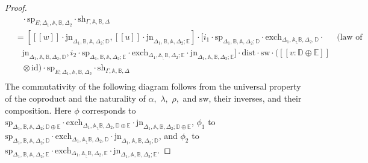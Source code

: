 \documentclass[10pt,a4paper]{amsart}
\theoremstyle{definition}
\theoremstyle{definition}
\theoremstyle{definition}
\theoremstyle{definition}
\theoremstyle{definition}
\theoremstyle{definition}
\begin{document}
\begin{proof}
\begin{align*}
  & \hspace{10pt} \cdot\text{sp}_{E; \Delta_{1},\mathbb{A},\mathbb{B},  \Delta_{2}} \cdot \text{sh}_{\Gamma,\mathbb{A}, \mathbb{B},\Delta} \\
  & = [[\![ w ]\!] \cdot \text{jn}_{\Delta_{1} ,\mathbb{B},\mathbb{A},  \Delta_{2};\mathbb{D}},  [\![u ]\!] \cdot \text{jn}_{\Delta_{1} ,\mathbb{B},\mathbb{A},  \Delta_{2};\mathbb{E}}] \cdot [ i_1 \cdot  \text{sp}_{\Delta_{1}, \mathbb{B}, \mathbb{A}, \Delta_{2};\mathbb{D}} \cdot  \text{exch}_{\Delta_{1},\underline{\mathbb{A},\mathbb{B}},  \Delta_{2},\mathbb{D}} \cdot  & {\text{(law of coproducts)}} \\
  & \hspace{10pt}  \text{jn}_{\Delta_{1},\mathbb{A},\mathbb{B},  \Delta_{2},\mathbb{D}},  i_2 \cdot  \text{sp}_{\Delta_{1}, \mathbb{B}, \mathbb{A}, \Delta_{2};\mathbb{E}} \cdot  \text{exch}_{\Delta_{1},\underline{\mathbb{A},\mathbb{B}},  \Delta_{2};\mathbb{E}} \cdot  \text{jn}_{\Delta_{1},\mathbb{A},\mathbb{B},  \Delta_{2};\mathbb{E}} ] \cdot \text{dist} \cdot \text{sw} \cdot ([\![  v : \mathbb{D} \oplus \mathbb{E}  ]\!] \\
  & \hspace{10pt} \otimes \text{id})  \cdot\text{sp}_{E; \Delta_{1},\mathbb{A},\mathbb{B},  \Delta_{2}} \cdot \text{sh}_{\Gamma,\mathbb{A}, \mathbb{B},\Delta} \\ 
\end{align*}
The commutativity of the following diagram follows from the universal property of the coproduct and the naturality of $\alpha,$ $\lambda,$ $\rho,$ and $\text{sw}$, their inverses, and their composition. Here $\phi$ corresponds to $\text{sp}_{\Delta_{1}, \mathbb{B}, \mathbb{A}, \Delta_{2}; \mathbb{D} \oplus\mathbb{E}} \cdot  \text{exch}_{\Delta_{1},\underline{\mathbb{A},\mathbb{B}},  \Delta_{2}, \mathbb{D} \oplus\mathbb{E}} \cdot  \text{jn}_{\Delta_{1},\mathbb{A},\mathbb{B},  \Delta_{2}; \mathbb{D} \oplus\mathbb{E}}$, $\phi_1$ to $\text{sp}_{\Delta_{1}, \mathbb{B}, \mathbb{A}, \Delta_{2}; \mathbb{D}} \cdot  \text{exch}_{\Delta_{1},\underline{\mathbb{A},\mathbb{B}},  \Delta_{2}, \mathbb{D}} \cdot  \text{jn}_{\Delta_{1},\mathbb{A},\mathbb{B},  \Delta_{2}; \mathbb{D}}$, and $\phi_2$ to $\text{sp}_{\Delta_{1}, \mathbb{B}, \mathbb{A}, \Delta_{2}; \mathbb{E}} \cdot  \text{exch}_{\Delta_{1},\underline{\mathbb{A},\mathbb{B}},  \Delta_{2}, \mathbb{E}} \cdot  \text{jn}_{\Delta_{1},\mathbb{A},\mathbb{B},  \Delta_{2}; \mathbb{E}}$.



\end{proof}
\end{document}
